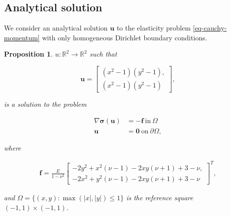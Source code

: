 \documentclass[a4paper,english]{elsarticle}%
\newtheorem{proposition}[theorem]{Proposition}
\begin{document}
\subsection{Analytical solution}


    We consider an analytical solution $\bm u$ to the elasticity problem \eqref{eq-cauchy-momentum} with only homogeneous Dirichlet boundary conditions.

\begin{proposition} \label{prop-eleastic-test-case}
    $u: \mathbb{R}^2 \rightarrow \mathbb{R}^2$ such that

    \begin{equation} \bm u =
        \begin{bmatrix}
            (x^2-1)(y^2-1), \\
            (x^2-1)(y^2-1)
        \end{bmatrix},
    \end{equation}

    is a solution to the problem

    \begin{align*}
        \nabla \bm \sigma (\bm u) &= -\bm f \ \text{in} \ \Omega \\
        \bm u &= \bm 0 \ \text{on}  \ \partial  \Omega,
    \end{align*}

    where

    \begin{align*}
        \bm f = \frac{E}{1-\nu^2}   
        \begin{bmatrix}
            -2y^2 + x^2(\nu - 1) -2xy(\nu +1) + 3 - \nu, \\
            -2x^2 + y^2(\nu - 1) -2xy(\nu +1) + 3 - \nu 
        \end{bmatrix}^T,
    \end{align*}

    and $\Omega = \{ (x,y) : \max (|x|,|y|) \leq 1 \}$ is the reference square $(-1,1) \times (-1,1)$.

\end{proposition}
\end{document}
